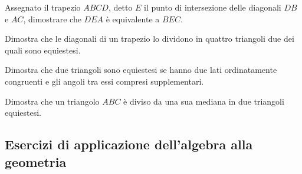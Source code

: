 \begin{multicols}{2}
\begin{esercizio}
\label{ese:7.6}
Assegnato il trapezio $ABCD$, detto $E$ il punto di intersezione delle diagonali $DB$ e $AC$, dimostrare che $DEA$ è equivalente a $BEC$.
\end{esercizio}

\begin{esercizio}
\label{ese:7.7}
Dimostra che le diagonali di un trapezio lo dividono in quattro triangoli due dei quali sono equiestesi.
\end{esercizio}

\begin{esercizio}
\label{ese:7.8}
Dimostra che due triangoli sono equiestesi se hanno due lati ordinatamente congruenti e gli angoli tra essi compresi supplementari.
\end{esercizio}

\begin{esercizio}
\label{ese:7.9}
Dimostra che un triangolo $ABC$ è diviso da una sua mediana in due triangoli equiestesi.
\end{esercizio}

\end{multicols}

\subsection{Esercizi di applicazione dell'algebra alla geometria}

